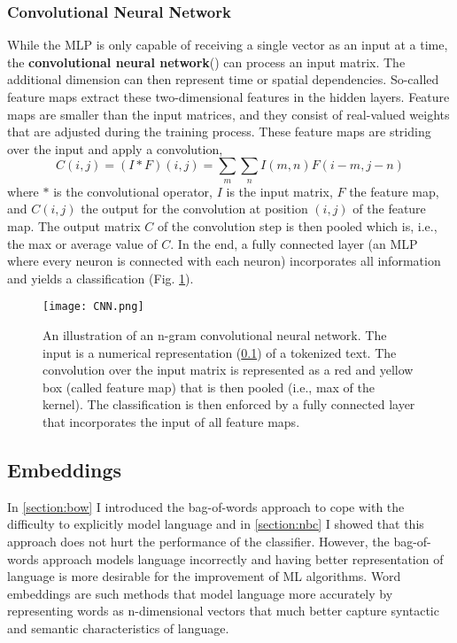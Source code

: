 \subsubsection{Convolutional Neural Network}
While the MLP is only capable of receiving a single vector as an input at a time, the \textbf{convolutional neural network}() can process an input matrix. The additional dimension can then represent time or spatial dependencies. So-called feature maps extract these two-dimensional features in the hidden layers. Feature maps are smaller than the input matrices, and they consist of real-valued weights that are adjusted during the training process. These feature maps are striding over the input and apply a convolution,
\[C(i,j) = (I \ast F)(i,j) = \sum_m \sum_n I(m, n) F(i-m, j-n)\] where $\ast$ is the convolutional operator, $I$ is the input matrix, $F$ the feature map, and $C(i,j)$ the output for the convolution at position $(i,j)$ of the feature map. The output matrix $C$ of the convolution step is then pooled which is, i.e., the max or average value of $C$. In the end, a fully connected layer (an MLP where every neuron is connected with each neuron) incorporates all information and yields a classification (Fig. \ref{fig:cnn}).
\begin{figure}[h!]
    \centering
    \texttt{[image: CNN.png]}
    \caption{An illustration of an n-gram convolutional neural network. The input is a numerical representation (\ref{section:embeddings}) of a tokenized text. The convolution over the input matrix is represented as a red and yellow box (called feature map) that is then pooled (i.e., max of the kernel). The classification is then enforced by a fully connected layer that incorporates the input of all feature maps.}
    \label{fig:cnn}
\end{figure}

\subsection{Embeddings}\label{section:embeddings}
In \ref{section:bow} I introduced the bag-of-words approach to cope with the difficulty to explicitly model language and in \ref{section:nbc} I showed that this approach does not hurt the performance of the classifier. However, the bag-of-words approach models language incorrectly and having better representation of language is more desirable for the improvement of ML algorithms. Word embeddings are such methods that model language more accurately by representing words as n-dimensional vectors that much better capture syntactic and semantic characteristics of language.

